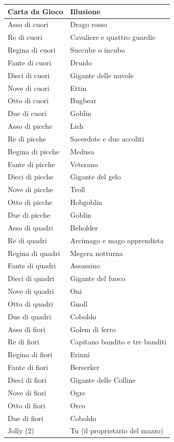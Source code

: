 \begin{multicols}{2}
\noindent\begin{tabularx}{0.48\textwidth}{ll}
\textbf{Carta da Gioco} & \textbf{Illusione} \\ \hline
Asso di cuori & Drago rosso \\
Re di cuori & Cavaliere e quattro guardie \\
Regina di cuori & Succube o incubo \\
Fante di cuori & Druido \\
Dieci di cuori & Gigante delle nuvole \\
Nove di cuori & Ettin \\
Otto di cuori & Bugbear \\
Due di cuori & Goblin \\
Asso di picche & Lich \\
Re di picche & Sacerdote e due accoliti \\
Regina di picche & Medusa \\
Fante di picche & Veterano \\
Dieci di picche & Gigante del gelo \\
Nove di picche & Troll \\
Otto di picche & Hobgoblin \\
Due di picche & Goblin \\
Asso di quadri & Beholder \\
Re di quadri & Arcimago e mago apprendista \\
Regina di quadri & Megera notturna \\
Fante di quadri & Assassino \\
Dieci di quadri & Gigante del fuoco \\
Nove di quadri & Oni \\
Otto di quadri & Gnoll \\
Due di quadri & Coboldo \\
Asso di fiori & Golem di ferro \\
Re di fiori & Capitano bandito e tre banditi \\
Regina di fiori & Erinni \\
Fante di fiori & Berserker \\
Dieci di fiori & Gigante delle Colline \\
Nove di fiori & Ogre \\
Otto di fiori & Orco \\
Due di fiori & Coboldo \\
Jolly (2) & Tu (il proprietario del mazzo) \\
\end{tabularx}


\end{multicols}
